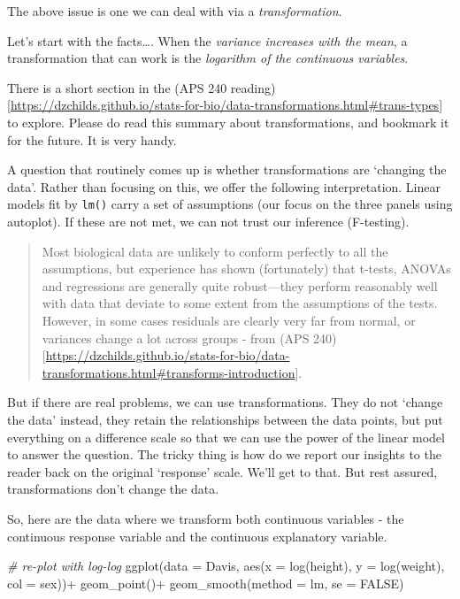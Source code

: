 \documentclass[
]{book}
\newenvironment{Shaded}{\begin{snugshade}}{\end{snugshade}}
\newcommand{\AttributeTok}[1]{\textcolor[rgb]{0.77,0.63,0.00}{#1}}
\newcommand{\CommentTok}[1]{\textcolor[rgb]{0.56,0.35,0.01}{\textit{#1}}}
\newcommand{\ConstantTok}[1]{\textcolor[rgb]{0.00,0.00,0.00}{#1}}
\newcommand{\FunctionTok}[1]{\textcolor[rgb]{0.00,0.00,0.00}{#1}}
\newcommand{\NormalTok}[1]{#1}
\newcommand{\SpecialCharTok}[1]{\textcolor[rgb]{0.00,0.00,0.00}{#1}}
\begin{document}
The above issue is one we can deal with via a \emph{transformation}.

Let's start with the facts\ldots. When the \emph{variance increases with the mean}, a transformation that can work is the \emph{logarithm of the continuous variables}.

There is a short section in the (APS 240 reading){[}\url{https://dzchilds.github.io/stats-for-bio/data-transformations.html\#trans-types}{]} to explore. Please do read this summary about transformations, and bookmark it for the future. It is very handy.

A question that routinely comes up is whether transformations are `changing the data'. Rather than focusing on this, we offer the following interpretation. Linear models fit by \texttt{lm()} carry a set of assumptions (our focus on the three panels using autoplot). If these are not met, we can not trust our inference (F-testing).

\begin{quote}
Most biological data are unlikely to conform perfectly to all the assumptions, but experience has shown (fortunately) that t-tests, ANOVAs and regressions are generally quite robust---they perform reasonably well with data that deviate to some extent from the assumptions of the tests. However, in some cases residuals are clearly very far from normal, or variances change a lot across groups - from (APS 240){[}\url{https://dzchilds.github.io/stats-for-bio/data-transformations.html\#transforms-introduction}{]}.
\end{quote}

But if there are real problems, we can use transformations. They do not `change the data' instead, they retain the relationships between the data points, but put everything on a difference scale so that we can use the power of the linear model to answer the question. The tricky thing is how do we report our insights to the reader back on the original `response' scale. We'll get to that. But rest assured, transformations don't change the data.

So, here are the data where we transform both continuous variables - the continuous response variable and the continuous explanatory variable.

\begin{Shaded}
\begin{Highlighting}[]
\CommentTok{\# re{-}plot with log{-}log}
\FunctionTok{ggplot}\NormalTok{(}\AttributeTok{data =}\NormalTok{ Davis, }\FunctionTok{aes}\NormalTok{(}\AttributeTok{x =} \FunctionTok{log}\NormalTok{(height), }\AttributeTok{y =} \FunctionTok{log}\NormalTok{(weight), }\AttributeTok{col =}\NormalTok{ sex))}\SpecialCharTok{+}
  \FunctionTok{geom\_point}\NormalTok{()}\SpecialCharTok{+}
  \FunctionTok{geom\_smooth}\NormalTok{(}\AttributeTok{method =}\NormalTok{ lm, }\AttributeTok{se =} \ConstantTok{FALSE}\NormalTok{)}
\end{Highlighting}
\end{Shaded}
\end{document}
